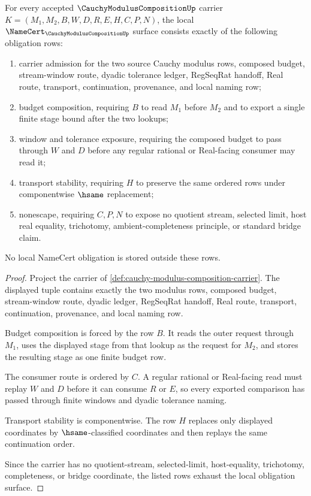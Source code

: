 \begin{theorem}
\label{thm:cauchy-modulus-composition-namecert-obligations}
For every accepted $\CauchyModulusCompositionUp$ carrier $K=(M_1,M_2,B,W,D,R,E,H,C,P,N)$, the local $\NameCert_{\CauchyModulusCompositionUp}$ surface consists exactly of the following obligation rows:
\begin{enumerate}
\item carrier admission for the two source Cauchy modulus rows, composed budget, stream-window route, dyadic tolerance ledger, RegSeqRat handoff, Real route, transport, continuation, provenance, and local naming row;
\item budget composition, requiring $B$ to read $M_1$ before $M_2$ and to export a single finite stage bound after the two lookups;
\item window and tolerance exposure, requiring the composed budget to pass through $W$ and $D$ before any regular rational or Real-facing consumer may read it;
\item transport stability, requiring $H$ to preserve the same ordered rows under componentwise $\hsame$ replacement;
\item nonescape, requiring $C,P,N$ to expose no quotient stream, selected limit, host real equality, trichotomy, ambient-completeness principle, or standard bridge claim.
\end{enumerate}
No local NameCert obligation is stored outside these rows.
\end{theorem}
\begin{proof}
Project the carrier of \autoref{def:cauchy-modulus-composition-carrier}. The displayed tuple contains exactly the two modulus rows, composed budget, stream-window route, dyadic ledger, RegSeqRat handoff, Real route, transport, continuation, provenance, and local naming row.

Budget composition is forced by the row $B$. It reads the outer request through $M_1$, uses the displayed stage from that lookup as the request for $M_2$, and stores the resulting stage as one finite budget row.

The consumer route is ordered by $C$. A regular rational or Real-facing read must replay $W$ and $D$ before it can consume $R$ or $E$, so every exported comparison has passed through finite windows and dyadic tolerance naming.

Transport stability is componentwise. The row $H$ replaces only displayed coordinates by $\hsame$-classified coordinates and then replays the same continuation order.

Since the carrier has no quotient-stream, selected-limit, host-equality, trichotomy, completeness, or bridge coordinate, the listed rows exhaust the local obligation surface.
\end{proof}

